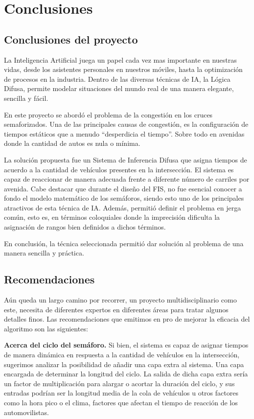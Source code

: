 \chapter{Conclusiones}

\section{Conclusiones del proyecto}
La Inteligencia Artificial juega un papel cada vez mas importante en nuestras vidas, desde los asistentes personales en nuestros móviles, hasta la optimización de procesos en la industria. Dentro de las diversas técnicas de IA, la Lógica Difusa, permite modelar situaciones del mundo real de una manera elegante, sencilla y fácil.

En este proyecto se abordó el problema de la congestión en los cruces semaforizados. Una de las principales causas de congestión, es la configuración de tiempos estáticos que a menudo ``desperdicia el tiempo''. Sobre todo en avenidas donde la cantidad de autos es nula o mínima.

La solución propuesta fue un Sistema de Inferencia Difusa que asigna tiempos de acuerdo a la cantidad de vehículos presentes en la intersección. El sistema es capaz de reaccionar de manera adecuada frente a diferente número de carriles por avenida. Cabe destacar que durante el diseño del FIS, no fue esencial conocer a fondo el modelo matemático de los semáforos, siendo esto uno de los principales atractivos de esta técnica de IA. Además, permitió definir el problema en jerga común, esto es, en términos coloquiales donde la imprecisión dificulta la asignación de rangos bien definidos a dichos términos.

En conclusión, la técnica seleccionada permitió dar solución al problema de una manera sencilla y práctica. 

\section{Recomendaciones}
Aún queda un largo camino por recorrer, un proyecto multidisciplinario como este, necesita de diferentes expertos en diferentes áreas para tratar algunos detalles finos. Las recomendaciones que emitimos en pro de mejorar la eficacia del algoritmo son las siguientes:

\textbf{Acerca del ciclo del semáforo.}
Si bien, el sistema es capaz de asignar tiempos de manera dinámica en respuesta a la cantidad de vehículos en la intersección, sugerimos analizar la posibilidad de añadir una capa extra al sistema. Una capa encargada de determinar la longitud del ciclo. La salida de dicha capa extra sería un factor de multiplicación para alargar o acortar la duración del ciclo, y sus entradas podrían ser la longitud media de la cola de vehículos u otros factores como la hora pico o el clima, factores que afectan el tiempo de reacción de los automovilistas.

